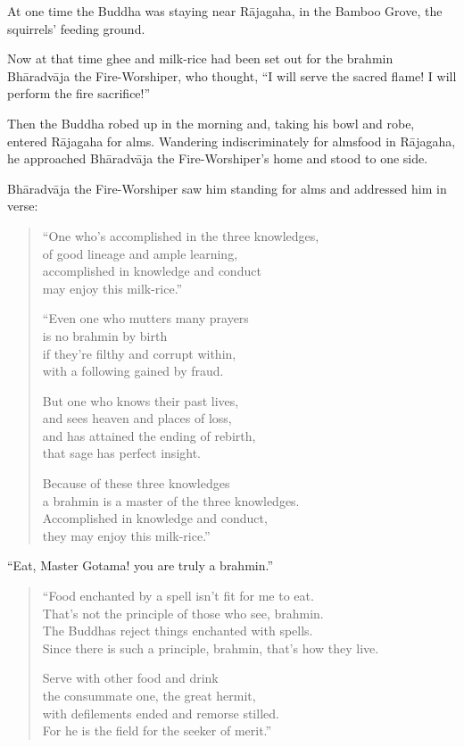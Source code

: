 \documentclass[12pt,openany]{book}%
\begin{document}
At one time the Buddha was staying near \textsanskrit{Rājagaha}, in the Bamboo Grove, the squirrels’ feeding ground. 

Now at that time ghee and milk-rice had been set out for the brahmin \textsanskrit{Bhāradvāja} the Fire-Worshiper, who thought, “I will serve the sacred flame! I will perform the fire sacrifice!” 

Then the Buddha robed up in the morning and, taking his bowl and robe, entered \textsanskrit{Rājagaha} for alms. Wandering indiscriminately for almsfood in \textsanskrit{Rājagaha}, he approached \textsanskrit{Bhāradvāja} the Fire-Worshiper’s home and stood to one side. 

\textsanskrit{Bhāradvāja} the Fire-Worshiper saw him standing for alms and addressed him in verse: 

\begin{verse}%
“One who’s accomplished in the three knowledges, \\
of good lineage and ample learning, \\
accomplished in knowledge and conduct \\
may enjoy this milk-rice.” 

“Even one who mutters many prayers \\
is no brahmin by birth \\
if they’re filthy and corrupt within, \\
with a following gained by fraud. 

But one who knows their past lives, \\
and sees heaven and places of loss, \\
and has attained the ending of rebirth, \\
that sage has perfect insight. 

Because of these three knowledges \\
a brahmin is a master of the three knowledges. \\
Accomplished in knowledge and conduct, \\
they may enjoy this milk-rice.” 

%
\end{verse}

“Eat, Master Gotama! you are truly a brahmin.” 

\begin{verse}%
“Food enchanted by a spell isn’t fit for me to eat. \\
That’s not the principle of those who see, brahmin. \\
The Buddhas reject things enchanted with spells. \\
Since there is such a principle, brahmin, that’s how they live. 

Serve with other food and drink \\
the consummate one, the great hermit, \\
with defilements ended and remorse stilled. \\
For he is the field for the seeker of merit.” 

%
\end{verse}
\end{document}
